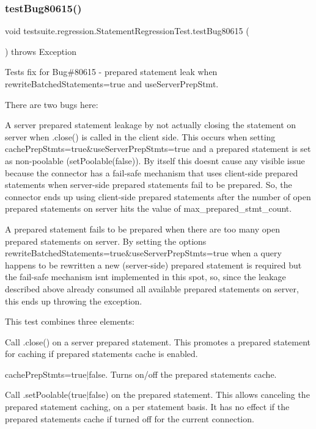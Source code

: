 \subsubsection{\texorpdfstring{test\+Bug80615()}{testBug80615()}}
{\footnotesize\ttfamily void testsuite.\+regression.\+Statement\+Regression\+Test.\+test\+Bug80615 (\begin{DoxyParamCaption}{ }\end{DoxyParamCaption}) throws Exception}

Tests fix for Bug\#80615 -\/ prepared statement leak when rewrite\+Batched\+Statements=true and use\+Server\+Prep\+Stmt.

There are two bugs here\+:
\begin{DoxyEnumerate}
\item A server prepared statement leakage by not actually closing the statement on server when .close() is called in the client side. This occurs when setting \textquotesingle{}cache\+Prep\+Stmts=true\&use\+Server\+Prep\+Stmts=true\textquotesingle{} and a prepared statement is set as non-\/poolable (\textquotesingle{}set\+Poolable(false)\textquotesingle{}). By itself this doesn\textquotesingle{}t cause any visible issue because the connector has a fail-\/safe mechanism that uses client-\/side prepared statements when server-\/side prepared statements fail to be prepared. So, the connector ends up using client-\/side prepared statements after the number of open prepared statements on server hits the value of \textquotesingle{}max\+\_\+prepared\+\_\+stmt\+\_\+count\textquotesingle{}.
\item A prepared statement fails to be prepared when there are too many open prepared statements on server. By setting the options \textquotesingle{}rewrite\+Batched\+Statements=true\&use\+Server\+Prep\+Stmts=true\textquotesingle{} when a query happens to be rewritten a new (server-\/side) prepared statement is required but the fail-\/safe mechanism isn\textquotesingle{}t implemented in this spot, so, since the leakage described above already consumed all available prepared statements on server, this ends up throwing the exception.
\end{DoxyEnumerate}

This test combines three elements\+:
\begin{DoxyEnumerate}
\item Call .close() on a server prepared statement. This promotes a prepared statement for caching if prepared statements cache is enabled.
\item cache\+Prep\+Stmts=true$\vert$false. Turns on/off the prepared statements cache.
\item Call .set\+Poolable(true$\vert$false) on the prepared statement. This allows canceling the prepared statement caching, on a per statement basis. It has no effect if the prepared statements cache if turned off for the current connection.
\end{DoxyEnumerate}

